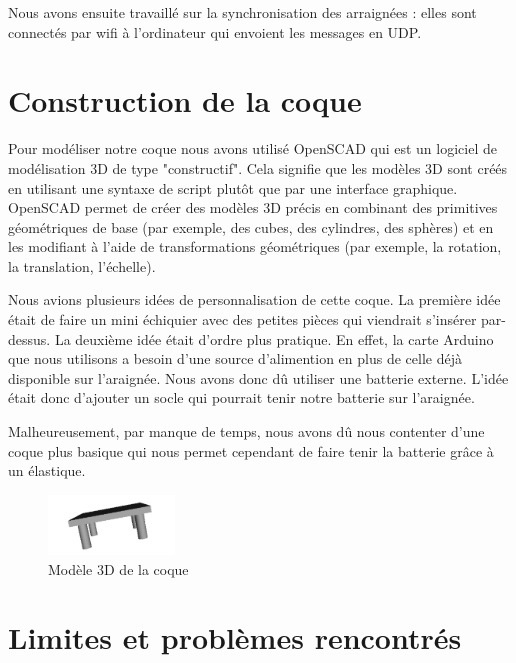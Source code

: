 Nous avons ensuite travaillé sur la synchronisation des arraignées : elles sont connectés par wifi à l'ordinateur qui envoient 
les messages en UDP.

		\section{Construction de la coque}

Pour modéliser notre coque nous avons utilisé OpenSCAD qui est un logiciel de modélisation 3D de type "constructif". 
Cela signifie que les modèles 3D sont créés en utilisant une syntaxe de script plutôt que par une interface graphique. 
OpenSCAD permet de créer des modèles 3D précis en combinant des primitives géométriques de base (par exemple, des cubes, des cylindres, 
des sphères) et en les modifiant à l'aide de transformations géométriques (par exemple, la rotation, la translation, l'échelle).  
\linebreak

Nous avions plusieurs idées de personnalisation de cette coque. La première idée était de faire un mini échiquier avec des petites 
pièces qui viendrait s’insérer par-dessus.  
La deuxième idée était d'ordre plus pratique. En effet, la carte Arduino que nous utilisons a besoin d’une source d’alimention 
en plus de celle déjà disponible sur l’araignée. Nous avons donc dû utiliser une batterie externe. 
L’idée était donc d’ajouter un socle qui pourrait tenir notre batterie sur l’araignée. 
\linebreak

Malheureusement, par manque de temps, nous avons dû nous contenter d’une coque plus basique qui nous permet cependant de 
faire tenir la batterie grâce à un élastique. 

\begin{figure}[H]
	\begin{center}
		\includegraphics[width=0.3\textwidth]{./img/coque}
		\caption{Modèle 3D de la coque}
	\end{center}
\end{figure}


		\section{Limites et problèmes rencontrés}

